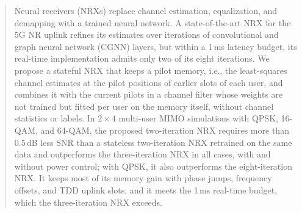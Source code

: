 \begin{abstract}
Neural receivers (NRXs) replace channel estimation, equalization, and demapping with a trained neural network. A state-of-the-art NRX for the 5G NR uplink refines its estimates over iterations of convolutional and graph neural network (CGNN) layers, but within a 1\,ms latency budget, its real-time implementation admits only two of its eight iterations. We propose a stateful NRX that keeps a pilot memory, i.e., the least-squares channel estimates at the pilot positions of earlier slots of each user, and combines it with the current pilots in a channel filter whose weights are not trained but fitted per user on the memory itself, without channel statistics or labels. In $2\times 4$ multi-user MIMO simulations with QPSK, 16-QAM, and 64-QAM, the proposed two-iteration NRX requires more than 0.5\,dB less SNR than a stateless two-iteration NRX retrained on the same data and outperforms the three-iteration NRX in all cases, with and without power control; with QPSK, it also outperforms the eight-iteration NRX. It keeps most of its memory gain with phase jumps, frequency offsets, and TDD uplink slots, and it meets the 1\,ms real-time budget, which the three-iteration NRX exceeds.
\end{abstract}

